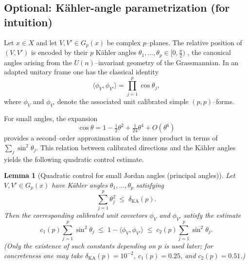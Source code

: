 \documentclass[11pt]{article}
\newcommand{\REVMZ}[1]{\textcolor{teal}{#1}}  %
\numberwithin{equation}{section}  %
\theoremstyle{plain}
\newtheorem{lemma}[theorem]{Lemma}
\theoremstyle{definition}
\theoremstyle{remark}
\newcommand{\Gp}{G_p}
\begin{document}

\subsection*{Optional: K\"ahler-angle parametrization (for intuition)}

Let $x \in X$ and let $V,V' \in \Gp(x)$ be complex $p$--planes.
The relative position of $(V,V')$ is encoded by their $p$ K\"ahler angles
$\theta_{1},\ldots,\theta_{p} \in [0,\tfrac{\pi}{2})$ \REVMZ{\cite{GH78}}, the canonical angles
arising from the $U(n)$--invariant geometry of the Grassmannian.
In an adapted unitary frame one has the classical identity
\[
\langle \phi_{V},\phi_{V'} \rangle
= \prod_{j=1}^{p} \cos\theta_{j},
\]
where $\phi_{V}$ and $\phi_{V'}$ denote the associated unit calibrated
simple $(p,p)$--forms.

For small angles, the expansion
\[
\cos\theta
= 1 - \tfrac{1}{2}\theta^{2} + \tfrac{1}{24}\theta^{4}
+ O(\theta^{6})
\]
provides a second--order approximation of the inner product in terms of
$\sum_{j} \sin^{2}\theta_{j}$.  This relation between calibrated directions
and the K\"ahler angles yields the following quadratic control estimate.


\begin{lemma}[Quadratic control for small Jordan angles (principal angles)]
	\label{lem:kahler-angle}
	Let $V,V' \in \Gp(x)$ have K\"ahler angles
	$\theta_{1},\ldots,\theta_{p}$ satisfying
	\[
	\sum_{j=1}^{p} \theta_{j}^{2} \;\le\; \delta_{\mathrm{KA}}(p).
	\]
	Then the corresponding calibrated unit covectors $\phi_{V}$ and $\phi_{V'}$
	satisfy the estimate
	\begin{equation}\label{eq:kahler-angle-est}
		c_{1}(p)\sum_{j=1}^{p} \sin^{2}\theta_{j}
		\;\le\;
		1 - \langle \phi_{V}, \phi_{V'} \rangle
		\;\le\;
		c_{2}(p)\sum_{j=1}^{p} \sin^{2}\theta_{j}.
	\end{equation}
	(Only the existence of such constants depending on $p$ is used later; for concreteness one may take $\delta_{\mathrm{KA}}(p)=10^{-2}$, $c_{1}(p)=0.25$, and $c_{2}(p)=0.51$.)
\end{lemma}
\end{document}

